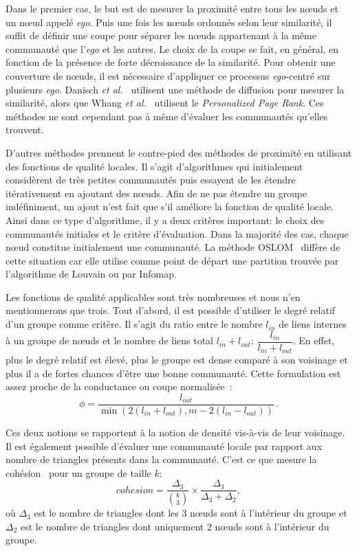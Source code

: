Dans le premier cas, le but est de mesurer la proximité entre tous les n\oe{}uds et un n\oe{}ud appelé \emph{ego}.
Puis une fois les n\oe{}uds ordonnés selon leur similarité, il suffit de définir une coupe pour séparer les n\oe{}uds appartenant à la même communauté que l'\emph{ego} et les autres.
Le choix de la coupe se fait, en général, en fonction de la présence de forte décroissance de la similarité.
Pour obtenir une couverture de n\oe{}uds, il est nécessaire d'appliquer ce processus \emph{ego}-centré sur plusieurs \emph{ego}.
Danisch \emph{et al.}~\cite{Danisch2012} utilisent une méthode de diffusion pour mesurer la similarité, alors que Whang \emph{et al.}~\cite{Whang2013} utilisent le \emph{Personalized Page Rank}.
Ces méthodes ne sont cependant pas à même d'évaluer les communautés qu'elles trouvent.
\bigskip

D'autres méthodes prennent le contre-pied des méthodes de proximité en utilisant des fonctions de qualité locales.
Il s'agit d'algorithmes qui initialement considèrent de très petites communautés puis essayent de les étendre itérativement en ajoutant des n\oe{}uds.
Afin de ne pas étendre un groupe indéfiniment, un ajout n'est fait que s'il améliore la fonction de qualité locale.
Ainsi dans ce type d'algorithme, il y a deux critères important:
le choix des communautés initiales et le critère d'évaluation.
Dans la majorité des cas, chaque n\oe{}ud constitue initialement une communauté. 
La méthode OSLOM~\cite{Lancichinetti2011a} diffère de cette situation car elle utilise comme point de départ une partition trouvée par l'algorithme de Louvain ou par Infomap.

Les fonctions de qualité applicables sont très nombreuses et nous n'en mentionnerons que trois.
Tout d'abord, il est possible d'utiliser le degré relatif~\cite{Luo2008} d'un groupe comme critère.
Il s'agit du ratio entre le nombre $l_{in}$ de liens internes à un groupe de n\oe{}uds et le nombre de liens total $l_{in}+l_{out}$: $ \dfrac{l_{in}}{l_{in}+l_{out}}$.
En effet, plus le degré relatif est élevé, plus le groupe est dense comparé à son voisinage et plus il a de fortes chances d'être une bonne communauté. 
Cette formulation est assez proche de la conductance ou coupe normalisée~\cite{Shi2000}:
\begin{equation}
\phi =\dfrac{l_{out}}{\min \left( 2(l_{in}+l_{out}),m-2(l_{in}-l_{out}) \right) }\,.
\end{equation}

Ces deux notions se rapportent à la notion de densité vis-à-vis de leur voisinage.
Il est également possible d'évaluer une communauté locale par rapport aux nombre de triangles présents dans la communauté.
C'est ce que mesure la cohésion~\cite{Friggeri2011} pour un groupe de taille $k$: 
\begin{equation}
cohesion=\dfrac{\Delta_3}{ {k \choose 3} } \times \frac{\Delta_3}{\Delta_3+\Delta_2},
\end{equation}
où $\Delta_3$ est le nombre de triangles dont les 3 n\oe{}uds sont à l'intérieur du groupe et $\Delta_2$ est le nombre de triangles dont uniquement 2 n\oe{}uds sont à l'intérieur du groupe.


